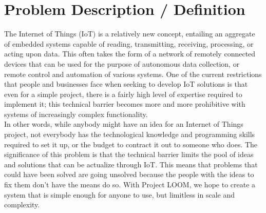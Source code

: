 \documentclass[onecolumn, draftclsnofoot,10pt, compsoc]{IEEEtran}
\begin{document}
\section{Problem Description / Definition}
    The Internet of Things (IoT) is a relatively new concept, entailing an aggregate of embedded systems capable of reading, transmitting, receiving, processing, or acting upon data. This often takes the form of a network of remotely connected devices that can be used for the purpose of autonomous data collection, or remote control and automation of various systems. One of the current restrictions that people and businesses face when seeking to develop IoT solutions is that even for a simple project, there is a fairly high level of expertise required to implement it; this technical barrier becomes more and more prohibitive with systems of increasingly complex functionality.\\
    In other words, while anybody might have an idea for an Internet of Things project, not everybody has the technological knowledge and programming skills required to set it up, or the budget to contract it out to someone who does. The significance of this problem is that the technical barrier limits the pool of ideas and solutions that can be actualize through IoT. This means that problems that could have been solved are going unsolved because the people with the ideas to fix them don’t have the means do so. With Project LOOM, we hope to create a system that is simple enough for anyone to use, but limitless in scale and complexity. 
\end{document}
